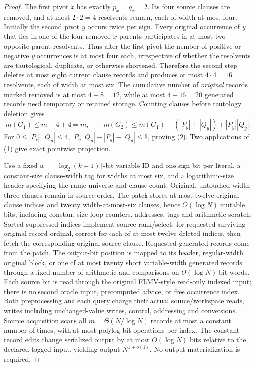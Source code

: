 \documentclass[11pt]{article}
\begin{document}
\begin{proof}
The first pivot $x$ has exactly $p_x=q_x=2$. Its four source clauses are removed, and at most $2\cdot2=4$ resolvents remain, each of width at most four. Initially the second pivot $y$ occurs twice per sign. Every original occurrence of $y$ that lies in one of the four removed $x$ parents participates in at most two opposite-parent resolvents. Thus after the first pivot the number of positive or negative $y$ occurrences is at most four each, irrespective of whether the resolvents are tautological, duplicate, or otherwise shortened. Therefore the second step deletes at most eight current clause records and produces at most $4\cdot4=16$ resolvents, each of width at most six. The cumulative number of \emph{original} records marked removed is at most $4+8=12$, while at most $4+16=20$ generated records need temporary or retained storage. Counting clauses before tautology deletion gives
\[
 m(G_1)\le m-4+4=m,\qquad
 m(G_2)\le m(G_1)-(|P_y|+|Q_y|)+|P_y||Q_y|.
\]
For $0\le |P_y|,|Q_y|\le4$,
$|P_y||Q_y|-|P_y|-|Q_y|\le8$, proving (2).
Two applications of (1) give exact pointwise projection.

Use a fixed $w=\lceil\log_2(k+1)\rceil$-bit variable ID and one sign bit per literal, a constant-size clause-width tag for widths at most six, and a logarithmic-size header specifying the name universe and clause count. Original, untouched width-three clauses remain in source order. The patch stores at most twelve original clause indices and twenty width-at-most-six clauses, hence $O(\log N)$ mutable bits, including constant-size loop counters, addresses, tags and arithmetic scratch. Sorted suppressed indices implement source-rank/select: for requested surviving original record ordinal, correct for each of at most twelve deleted indices, then fetch the corresponding original source clause. Requested generated records come from the patch. The output-bit position is mapped to its header, regular-width original block, or one of at most twenty short variable-width generated records through a fixed number of arithmetic and comparisons on $O(\log N)$-bit words. Each source bit is read through the original FLMV-style read-only indexed input; there is no second oracle input, precomputed advice, or free occurrence index. Both preprocessing and each query charge their actual source/workspace reads, writes including unchanged-value writes, control, addressing and conversions. Source acquisition scans all $m=\Theta(N/\log N)$ records at most a constant number of times, with at most polylog bit operations per index. The constant-record edits change serialized output by at most $O(\log N)$ bits relative to the declared tagged input, yielding output $N^{1+o(1)}$. No output materialization is required. \qedhere
\end{proof}
\end{document}
